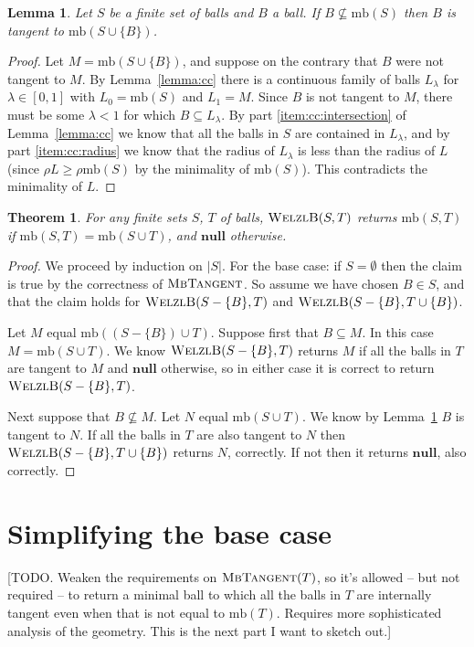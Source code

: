 \documentclass[a4paper]{article}
\newtheorem{lemma}{Lemma}[section]
\newtheorem{theorem}{Theorem}[section]
\newcommand\alg[1]{\mbox{\textsc{#1}}}
\newcommand\undef{\mathbf{null}}
\newcommand\mb{\mathrm{mb}}
\let\radius\rho
\begin{document}
\begin{lemma}\label{lemma:tangent}
  Let $S$ be a finite set of balls and $B$ a ball. If $B\not\subseteq\mb(S)$ then $B$ is tangent to $\mb(S\cup\{B\})$.
\end{lemma}
\begin{proof}
  Let $M = \mb(S\cup\{B\})$, and suppose on the contrary that $B$ were not tangent to $M$.
  By Lemma~\ref{lemma:cc} there is a continuous family of balls $L_\lambda$ for $\lambda\in[0,1]$
  with $L_0=\mb(S)$ and $L_1=M$. Since $B$ is not tangent to $M$, there must be some $\lambda<1$ for which $B\subseteq L_\lambda$. By part \ref{item:cc:intersection} of Lemma~\ref{lemma:cc} we know that all the balls in $S$ are contained in $L_\lambda$, and by part \ref{item:cc:radius} we know that the radius of $L_\lambda$ is less than the radius of $L$ (since $\radius L\geq \radius\mb(S)$ by the minimality of $\mb(S)$). This contradicts the minimality of $L$.
\end{proof}

\begin{theorem}
  For any finite sets $S$, $T$ of balls, $\alg{WelzlB}(S,T)$ returns $\mb(S,T)$ if $\mb(S,T)=\mb(S\cup T)$, and $\undef$ otherwise.
\end{theorem}
\begin{proof}
  We proceed by induction on $|S|$. For the base case: if $S=\emptyset$ then the claim is true by the correctness of $\alg{MbTangent}$. So assume we have chosen $B\in S$, and that the claim holds for $\alg{WelzlB}(S-\{B\},T)$ and $\alg{WelzlB}(S-\{B\},T\cup\{B\})$.

  Let $M$ equal $\mb((S-\{B\})\cup T)$. Suppose first that $B\subseteq M$. In this case $M=\mb(S\cup T)$. We know $\alg{WelzlB}(S-\{B\},T)$ returns $M$ if all the balls in $T$ are tangent to $M$ and $\undef$ otherwise, so in either case it is correct to return $\alg{WelzlB}(S-\{B\},T)$.

  Next suppose that $B\not\subseteq M$. Let $N$ equal $\mb(S\cup T)$. We know by Lemma~\ref{lemma:tangent} $B$ is tangent to $N$. If all the balls in $T$ are also tangent to $N$ then $\alg{WelzlB}(S-\{B\}, T\cup\{B\})$ returns $N$, correctly. If not then it returns $\undef$, also correctly.
\end{proof}

\section{Simplifying the base case}
[TODO. Weaken the requirements on $\alg{MbTangent}(T)$, so it's allowed -- but not required -- to return a minimal ball to which all the balls in $T$ are internally tangent even when that is not equal to $\mb(T)$. Requires more sophisticated analysis of the geometry. This is the next part I want to sketch out.]
\end{document}
